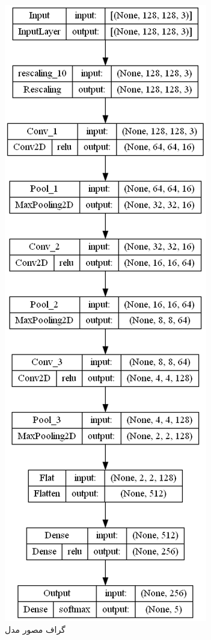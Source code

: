 \documentclass{article}
\begin{document}
\begin{figure}[!h]
    \centering\includegraphics[scale=.45]{./p1-21}
    \caption{گراف مصور مدل}\label{fig.121}
\end{figure}
\end{document}

